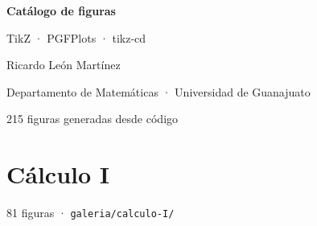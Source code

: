 \documentclass[11pt,a4paper]{article}
\begin{document}
\begin{titlepage}\centering
  \vspace*{5cm}
  {\Huge\bfseries\color{UGblue} Catálogo de figuras\par}
  \vspace{0.4cm}{\color{UGgold}\rule{0.5\textwidth}{1.2pt}}\par\vspace{0.4cm}
  {\Large TikZ · PGFPlots · tikz-cd\par}
  \vspace{1.5cm}
  {\large Ricardo León Martínez\par}
  {\normalsize Departamento de Matemáticas · Universidad de Guanajuato\par}
  \vfill
  {\small 215 figuras generadas desde código\par}
\end{titlepage}
\tableofcontents
\newpage

\section{Cálculo I}
{\small\color{black!60}81 figuras · \texttt{galeria/calculo-I/}}\par\bigskip
\end{document}
